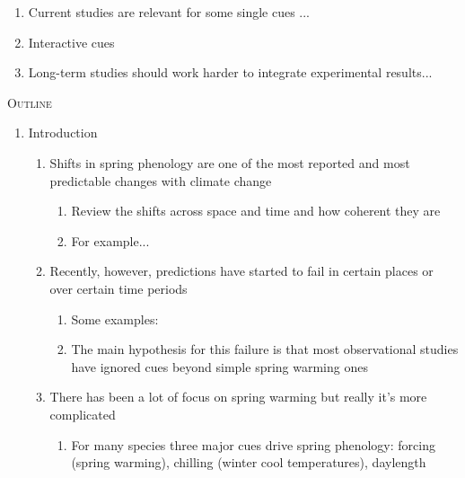 \documentclass[11pt,letterpaper]{article}
\renewcommand{\section}[1]{%
\bigskip
\begin{center}
\begin{Large}
\normalfont\scshape #1
\medskip
\end{Large}
\end{center}}
\begin{document}
\begin{enumerate}
\item Current studies are relevant for some single cues ...
\item Interactive cues
\item Long-term studies should work harder to integrate experimental results... 
\end{enumerate}



\section{Outline}
\begin{enumerate}
\item Introduction 
\begin{enumerate}
\item Shifts in spring phenology are one of the most reported and most predictable changes with climate change
\begin{enumerate}
\item Review the shifts across space and time and how coherent they are
\item For example... \citet{Schwartz:1997nn,Menzel2003a,Menzel:2006sq,delpierre2009,Ellwood2012,jochner2013,hereford2017}
\end{enumerate}
\item Recently, however, predictions have started to fail in certain places or over certain time periods
\begin{enumerate}
\item Some examples: \citet{yu2010,fu2015} %
\item The main hypothesis for this failure is that  most observational studies have ignored cues beyond simple spring warming ones \citep{chuine2016}
\end{enumerate}
\item There has been a lot of focus on spring warming but really it's more complicated
\begin{enumerate}
\item For many species three major cues drive spring phenology: forcing (spring warming), chilling (winter cool temperatures), daylength

\end{enumerate}
\end{enumerate}
\end{enumerate}
\end{document}

